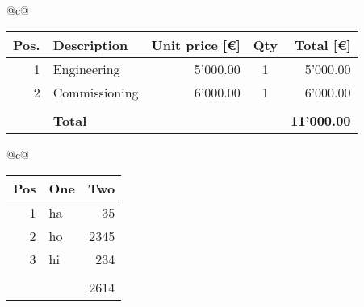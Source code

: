 \begin{longtable}{@{}c@{}} 
\caption{Quotation Price}\label{tbl:quotation-price}\tabularnewline 
\begin{tabular}{rlrcr} 
\textbf{Pos.} 	 & 	 \textbf{Description} 	 & 	 \textbf{Unit price [€]} 	 & 	 \textbf{Qty} 	 & 	 \textbf{Total [€]} \\ 
\midrule 
1 	 & 	 Engineering 	 & 	 5'000.00 	 & 	 1 	 & 	 5'000.00 \\ 
2 	 & 	 Commissioning 	 & 	 6'000.00 	 & 	 1 	 & 	 6'000.00 \\ 
  	 & 	   	 & 	   	 & 	   	 & 	   \\ 
\midrule 
  	 & 	 \textbf{Total} 	 & 	 \textbf{ } 	 & 	 \textbf{ } 	 & 	 \textbf{11'000.00} \\ 
\end{tabular} 
\end{longtable} 


\begin{longtable}{@{}c@{}} 
\caption{Table 2}\label{tbl:table-2}\tabularnewline 
\begin{tabular}{rlr} 
\toprule 
\textbf{Pos} 	 & 	 \textbf{One} 	 & 	 \textbf{Two} \\ 
\midrule 
1 	 & 	 ha 	 & 	 35 \\ 
2 	 & 	 ho 	 & 	 2345 \\ 
3 	 & 	 hi 	 & 	 234 \\ 
  	 & 	   	 & 	   \\ 
\midrule 
  	 & 	   	 & 	 2614 \\ 
\end{tabular} 
\end{longtable} 


